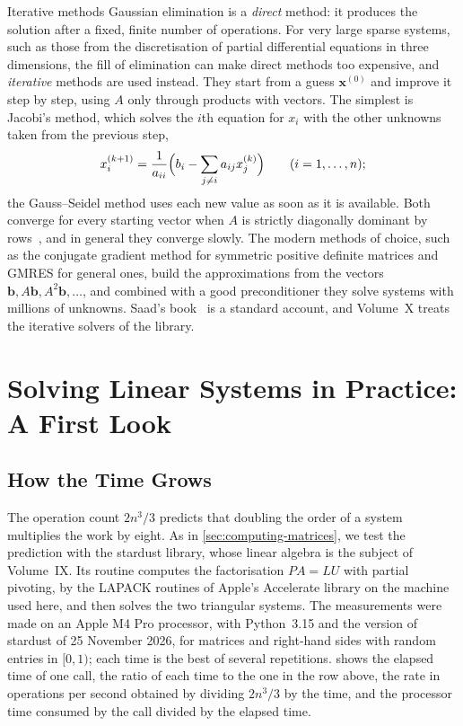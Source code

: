 \begin{note}{Iterative methods}
Gaussian elimination is a \emph{direct} method: it produces the solution after a fixed, finite number of operations. For very large sparse systems, such as those from the discretisation of partial differential equations in three dimensions, the fill of elimination can make direct methods too expensive, and \emph{iterative} methods are used instead. They start from a guess $\mathbf x^{(0)}$ and improve it step by step, using $A$ only through products with vectors. The simplest is Jacobi's method, which solves the $i$th equation for $x_i$ with the other unknowns taken from the previous step,
\[
x_i^{(k+1)}=\frac1{a_{ii}}\Bigl(b_i-\sum_{j\ne i}a_{ij}x_j^{(k)}\Bigr)\qquad(i=1,\ldots,n);
\]
the Gauss--Seidel method uses each new value as soon as it is available. Both converge for every starting vector when $A$ is strictly diagonally dominant by rows~\cite[Sect.~11.2]{golub2013}, and in general they converge slowly. The modern methods of choice, such as the conjugate gradient method for symmetric positive definite matrices and GMRES for general ones, build the approximations from the vectors $\mathbf b,A\mathbf b,A^2\mathbf b,\ldots$, and combined with a good preconditioner they solve systems with millions of unknowns. Saad's book~\cite{saad2003} is a standard account, and Volume~X treats the iterative solvers of the library.
\end{note}
\section{Solving Linear Systems in Practice: A First Look}
\label{sec:systems-practice}

\subsection{How the Time Grows}

The operation count $2n^3/3$ predicts that doubling the order of a system multiplies the work by eight. As in \cref{sec:computing-matrices}, we test the prediction with the stardust library, whose linear algebra is the subject of Volume~IX. Its routine  computes the factorisation $PA=LU$ with partial pivoting, by the LAPACK routines of Apple's Accelerate library on the machine used here, and then solves the two triangular systems. The measurements were made on an Apple M4 Pro processor, with Python~3.15 and the version of stardust of 25 November 2026, for matrices and right-hand sides with random entries in $[0,1)$; each time is the best of several repetitions.  shows the elapsed time of one call, the ratio of each time to the one in the row above, the rate in operations per second obtained by dividing $2n^3/3$ by the time, and the processor time consumed by the call divided by the elapsed time.

